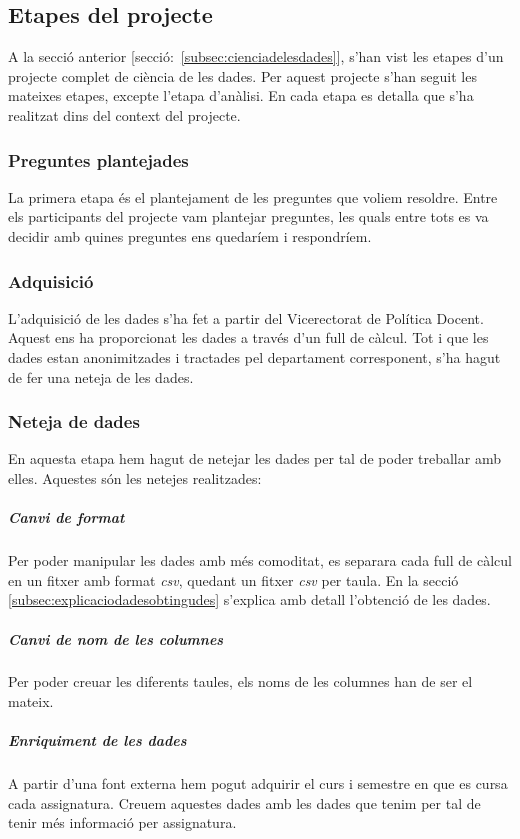 \documentclass[12pt,a4paper,catalan]{article}
\begin{document}
\subsection{Etapes del projecte}
A la secció anterior [secció:~\ref{subsec:cienciadelesdades}], s'han vist les etapes d'un projecte complet de ciència de les dades. Per aquest projecte s'han seguit les mateixes etapes, excepte l'etapa d'anàlisi. En cada etapa es detalla que s'ha realitzat dins del context del projecte.

\subsubsection{Preguntes plantejades}
La primera etapa és el plantejament de les preguntes que voliem resoldre. Entre els participants del projecte vam plantejar preguntes, les quals entre tots es va decidir amb quines preguntes ens quedaríem i respondríem.

\subsubsection{Adquisició}
L'adquisició de les dades s'ha fet a partir del Vicerectorat de Política Docent. Aquest ens ha proporcionat les dades a través d'un full de càlcul. Tot i que les dades estan anonimitzades i tractades pel departament corresponent, s'ha hagut de fer una neteja de les dades.

\subsubsection{Neteja de dades}
En aquesta etapa hem hagut de netejar les dades per tal de poder treballar amb elles. Aquestes són les netejes realitzades:

\subparagraph{Canvi de format}
Per poder manipular les dades amb més comoditat, es separara cada full de càlcul en un fitxer amb format \textit{csv}, quedant un fitxer \textit{csv} per taula. En la secció \ref{subsec:explicaciodadesobtingudes} s'explica amb detall l'obtenció de les dades.

\subparagraph{Canvi de nom de les columnes}
Per poder creuar les diferents taules, els noms de les columnes han de ser el mateix.

\subparagraph{Enriquiment de les dades}
A partir d'una font externa hem pogut adquirir el curs i semestre en que es cursa cada assignatura. Creuem aquestes dades amb les dades que tenim per tal de tenir més informació per assignatura.
\end{document}
